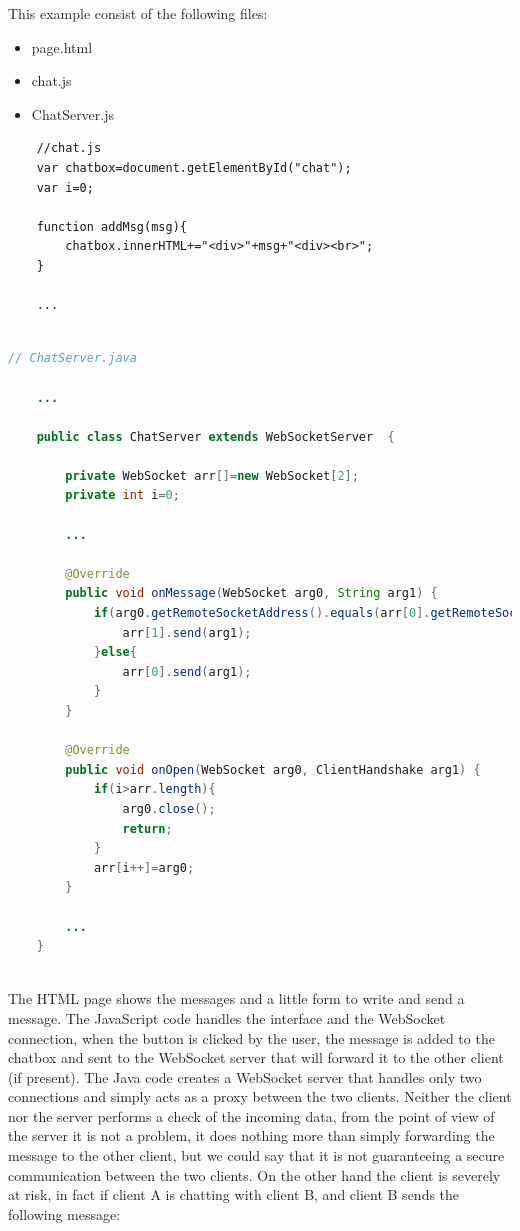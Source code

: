 	This example consist of the following files:
	\begin{itemize}
		\item page.html
		\item chat.js
		\item ChatServer.js
	\end{itemize}

	\begin{lstlisting}
	//chat.js
	var chatbox=document.getElementById("chat");
	var i=0;
	
	function addMsg(msg){
		chatbox.innerHTML+="<div>"+msg+"<div><br>";
	}
	
	...
	
	\end{lstlisting}
	
	\begin{lstlisting}[language=Java]
	// ChatServer.java
	
	...
	
	public class ChatServer extends WebSocketServer  {
	
		private WebSocket arr[]=new WebSocket[2];
		private int i=0;
		
		...
		
		@Override
		public void onMessage(WebSocket arg0, String arg1) {
			if(arg0.getRemoteSocketAddress().equals(arr[0].getRemoteSocketAddress())){
				arr[1].send(arg1);
			}else{
				arr[0].send(arg1);
			}
		}
		
		@Override
		public void onOpen(WebSocket arg0, ClientHandshake arg1) {
			if(i>arr.length){
				arg0.close();
				return;
			}
			arr[i++]=arg0;
		}
		
		...
	}
	
	\end{lstlisting}
	
	The HTML page shows the messages and a little form to write and send a message.\newline
	The JavaScript code handles the interface and the WebSocket connection, when the button is clicked by the user, the message is added to the chatbox and sent to the WebSocket server that will forward it to the other client (if present).\newline
	The Java code creates a WebSocket server that handles only two connections and simply acts as a proxy between the two clients.\newline
	Neither the client nor the server performs a check of the incoming data, from the point of view of the server it is not a problem, it does nothing more than simply forwarding the message to the other client, but we could say that it is not guaranteeing a secure communication between the two clients.\newline
	On the other hand the client is severely at risk, in fact if client A is chatting with client B, and client B sends the following message:\newline
	
